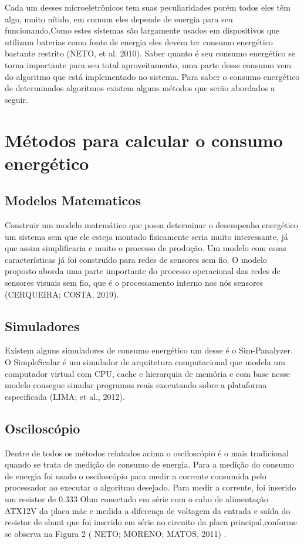 Cada um desses  microeletrônicos tem suas peculiaridades porém todos eles têm algo, muito nítido, em comum eles depende de energia para seu funcionando.Como estes sistemas são largamente usados em dispositivos que utilizam baterias como fonte de energia eles  devem ter consumo energético bastante restrito (NETO, et al. 2010). 
 Saber quanto é seu consumo energético se torna importante para seu total aproveitamento, uma parte desse consumo vem do algoritmo que está implementado no sistema. Para saber o consumo energético de determinados algoritmos existem alguns métodos que serão abordados a seguir.

\section{Métodos para calcular o consumo energético}

\subsection{Modelos Matematicos}
Construir um modelo matemático que possa determinar o desempenho energético um sistema sem que ele esteja montado fisicamente seria muito interessante, já que assim simplificaria e muito o processo de produção. Um modelo com essas características já foi construído para redes de sensores sem fio. O modelo proposto aborda uma parte importante do processo operacional das redes de sensores visuais sem fio, que é o processamento interno nos nós sensores (CERQUEIRA; COSTA, 2019).

\subsection{Simuladores}
Existem alguns simuladores de consumo energético um desse é o Sim-Panalyzer.  O SimpleScalar é um simulador de arquitetura computacional que modela um computador virtual com CPU, cache e hierarquia de memória e com base nesse modelo consegue simular programas reais executando sobre a plataforma especificada (LIMA; et al., 2012).

\subsection{Osciloscópio }
Dentre de todos os métodos relatados acima o osciloscópio é o mais tradicional quando se trata de medição de consumo de energia. Para a medição do consumo de energia foi usado o osciloscópio para medir a corrente consumida pelo processador ao executar o algoritmo desejado. Para medir a corrente, foi inserido um resistor de 0.333 Ohm conectado em série com o cabo de alimentação ATX12V da placa mãe e medida a diferença de voltagem da entrada e saída do resistor de shunt que foi inserido em série no circuito da placa principal,conforme se observa na Figura 2 ( NETO; MORENO; MATOS, 2011) .

